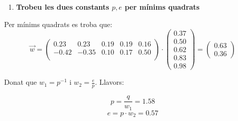 \documentclass[a4paper]{article}
\begin{document}
\pagebreak
\begin{enumerate}[resume]
	\item \textbf{Trobeu les dues constants $p,e$ per mínims quadrats}
\end{enumerate}

Per mínims quadrats es troba que:
$$
\vec{w} = 
\begin{pmatrix}
0.23 & 0.23 & 0.19 & 0.19 & 0.16 \\
-0.42 & -0.35 & 0.10 & 0.17 & 0.50 \\
\end{pmatrix} ·
\begin{pmatrix}
0.37 \\
0.50 \\
0.62 \\
0.83 \\
0.98
\end{pmatrix} =
\begin{pmatrix}
0.63 \\
0.36
\end{pmatrix}
$$

Donat que $w_1 = p^{-1}$ i $ w_2 = \frac{e}{p}$. Llavors:

$$
\boxed{p = \frac{q}{w_1} = 1.58}
$$
$$
\boxed{e = p · w_2 = 0.57}
$$
\end{document}
